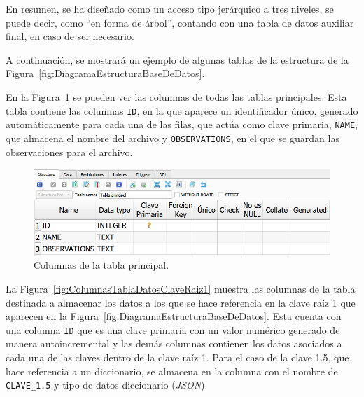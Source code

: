 En resumen, se ha diseñado como un acceso tipo jerárquico a tres niveles, se puede decir, como ``en forma de árbol'', contando con una tabla de datos auxiliar final, en caso de ser necesario.


A continuación, se mostrará un ejemplo de algunas tablas de la estructura de la Figura~\ref{fig:DiagramaEstructuraBaseDeDatos}.

En la Figura~\ref{fig:ColumnasTablaPrincipal} se pueden ver las columnas de todas las tablas principales. Esta tabla contiene las columnas \texttt{ID}, en la que aparece un identificador único, generado automáticamente para cada una de las filas, que actúa como clave primaria, \texttt{NAME}, que almacena el nombre del archivo y \texttt{OBSERVATIONS}, en el que se guardan las observaciones para el archivo.

\begin{figure}[H]
\centering
\includegraphics[width=1\textwidth]{fig/Base de datos estructura/Columnas tabla principal.png}
\caption{Columnas de la tabla principal.}
\label{fig:ColumnasTablaPrincipal}
\end{figure}

La Figura~\ref{fig:ColumnasTablaDatosClaveRaiz1} muestra las columnas de la tabla destinada a almacenar los datos a los que se hace referencia en la clave raíz 1 que aparecen en la Figura~\ref{fig:DiagramaEstructuraBaseDeDatos}. Esta cuenta con una columna \texttt{ID} que es una clave primaria con un valor numérico generado de manera autoincremental y las demás columnas contienen los datos asociados a cada una de las claves dentro de la clave raíz 1. Para el caso de la clave 1.5, que hace referencia a un diccionario, se almacena en la columna con el nombre de \texttt{CLAVE\_1.5} y tipo de datos diccionario (\textit{JSON}). 

